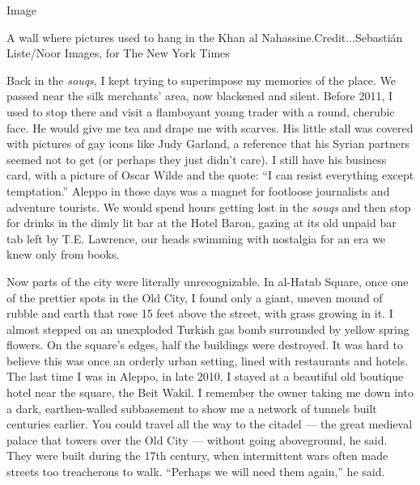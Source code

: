 Image

A wall where pictures used to hang in the Khan al
Nahassine.Credit...Sebastián Liste/Noor Images, for The New York Times

Back in the \emph{souqs}, I kept trying to superimpose my memories of
the place. We passed near the silk merchants' area, now blackened and
silent. Before 2011, I used to stop there and visit a flamboyant young
trader with a round, cherubic face. He would give me tea and drape me
with scarves. His little stall was covered with pictures of gay icons
like Judy Garland, a reference that his Syrian partners seemed not to
get (or perhaps they just didn't care). I still have his business card,
with a picture of Oscar Wilde and the quote: ``I can resist everything
except temptation.'' Aleppo in those days was a magnet for footloose
journalists and adventure tourists. We would spend hours getting lost in
the \emph{souqs} and then stop for drinks in the dimly lit bar at the
Hotel Baron, gazing at its old unpaid bar tab left by T.E. Lawrence, our
heads swimming with nostalgia for an era we knew only from books.

Now parts of the city were literally unrecognizable. In al-Hatab Square,
once one of the prettier spots in the Old City, I found only a giant,
uneven mound of rubble and earth that rose 15 feet above the street,
with grass growing in it. I almost stepped on an unexploded Turkish gas
bomb surrounded by yellow spring flowers. On the square's edges, half
the buildings were destroyed. It was hard to believe this was once an
orderly urban setting, lined with restaurants and hotels. The last time
I was in Aleppo, in late 2010, I stayed at a beautiful old boutique
hotel near the square, the Beit Wakil. I remember the owner taking me
down into a dark, earthen-walled subbasement to show me a network of
tunnels built centuries earlier. You could travel all the way to the
citadel --- the great medieval palace that towers over the Old City ---
without going aboveground, he said. They were built during the 17th
century, when intermittent wars often made streets too treacherous to
walk. ``Perhaps we will need them again,'' he said.

